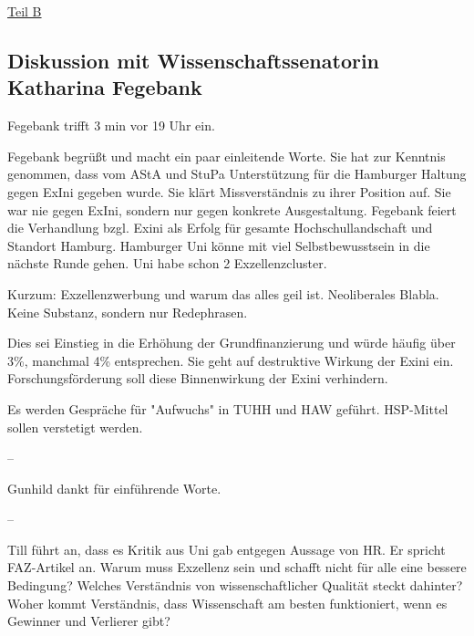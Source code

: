 \documentclass[ngerman,headheight=70pt]{scrartcl}
\begin{document}
    \vspace{0.5cm}
    {\Large \underline{Teil B}}


    \subsection{Diskussion mit Wissenschaftssenatorin Katharina Fegebank}

    Fegebank trifft 3 min vor 19 Uhr ein.

    Fegebank begrüßt und macht ein paar einleitende Worte. Sie hat zur Kenntnis
    genommen, dass vom AStA und StuPa Unterstützung für die Hamburger Haltung
    gegen ExIni gegeben wurde. Sie klärt Missverständnis zu ihrer Position auf.
    Sie war nie gegen ExIni, sondern nur gegen konkrete Ausgestaltung. Fegebank
    feiert die Verhandlung bzgl. Exini als Erfolg für gesamte Hochschullandschaft
    und Standort Hamburg. Hamburger Uni könne mit viel Selbstbewusstsein in die
    nächste Runde gehen. Uni habe schon 2 Exzellenzcluster.

    Kurzum: Exzellenzwerbung und warum das alles geil ist. Neoliberales Blabla.
    Keine Substanz, sondern nur Redephrasen.

    Dies sei Einstieg in die Erhöhung der Grundfinanzierung und würde häufig
    über 3\%, manchmal 4\% entsprechen. Sie geht auf destruktive Wirkung der
    Exini ein. Forschungsförderung soll diese Binnenwirkung der Exini verhindern.

    Es werden Gespräche für "Aufwuchs" in TUHH und HAW geführt. HSP-Mittel sollen
    verstetigt werden.

    --

    Gunhild dankt für einführende Worte.

    --

    Till führt an, dass es Kritik aus Uni gab entgegen Aussage von HR.
    Er spricht FAZ-Artikel an.
    Warum muss Exzellenz sein und schafft nicht für alle eine bessere
    Bedingung? Welches Verständnis von wissenschaftlicher Qualität steckt
    dahinter? Woher kommt Verständnis, dass Wissenschaft am besten funktioniert,
    wenn es Gewinner und Verlierer gibt?
\end{document}
